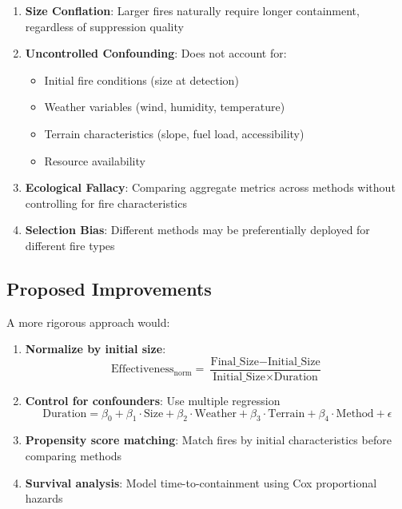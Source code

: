 \documentclass[12pt,a4paper]{article}
\begin{document}
\begin{enumerate}
    \item \textbf{Size Conflation}: Larger fires naturally require longer containment, regardless of suppression quality
    \item \textbf{Uncontrolled Confounding}: Does not account for:
    \begin{itemize}
        \item Initial fire conditions (size at detection)
        \item Weather variables (wind, humidity, temperature)
        \item Terrain characteristics (slope, fuel load, accessibility)
        \item Resource availability
    \end{itemize}
    \item \textbf{Ecological Fallacy}: Comparing aggregate metrics across methods without controlling for fire characteristics
    \item \textbf{Selection Bias}: Different methods may be preferentially deployed for different fire types
\end{enumerate}

\subsection{Proposed Improvements}

A more rigorous approach would:

\begin{enumerate}
    \item \textbf{Normalize by initial size}:
    \begin{equation}
    \text{Effectiveness}_{\text{norm}} = \frac{\text{Final\_Size} - \text{Initial\_Size}}{\text{Initial\_Size} \times \text{Duration}}
    \end{equation}

    \item \textbf{Control for confounders}: Use multiple regression
    \begin{equation}
    \text{Duration} = \beta_0 + \beta_1 \cdot \text{Size} + \beta_2 \cdot \text{Weather} + \beta_3 \cdot \text{Terrain} + \beta_4 \cdot \text{Method} + \epsilon
    \end{equation}

    \item \textbf{Propensity score matching}: Match fires by initial characteristics before comparing methods

    \item \textbf{Survival analysis}: Model time-to-containment using Cox proportional hazards
\end{enumerate}
\end{document}
